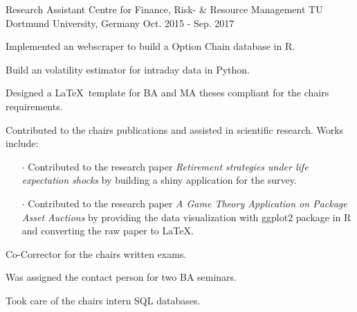 \begin{cventries}
\cventry
{Research Assistant} %
{Centre for Finance, Risk- \& Resource Management} %
{TU Dortmund University, Germany} %
{Oct. 2015 - Sep. 2017} %
{
  \begin{cvitems} %
    \item {Implemented an webscraper to build a Option Chain database in R.}
    \item {Build an volatility estimator for intraday data in Python.}
    \item {Designed a \LaTeX~template for BA and MA theses compliant for the chairs requirements.}
    \item {Contributed to the chairs publications and assisted in scientific research. Works include:
      \begin{itemize}
        \item[$\cdot$] Contributed to the research paper \textit{Retirement strategies under life expectation shocks} by building a shiny application for the survey.
        \item[$\cdot$] Contributed to the research paper \textit{A Game Theory Application on Package Asset Auctions} by providing the data visualization with ggplot2 package in R and converting the raw paper to \LaTeX{}.
      \end{itemize}
    }
    \item {Co-Corrector for the chairs written exams.}
    \item {Was assigned the contact person for two BA seminars.}
    \item {Took care of the chairs intern SQL databases.}
  \end{cvitems}
}

\end{cventries}

